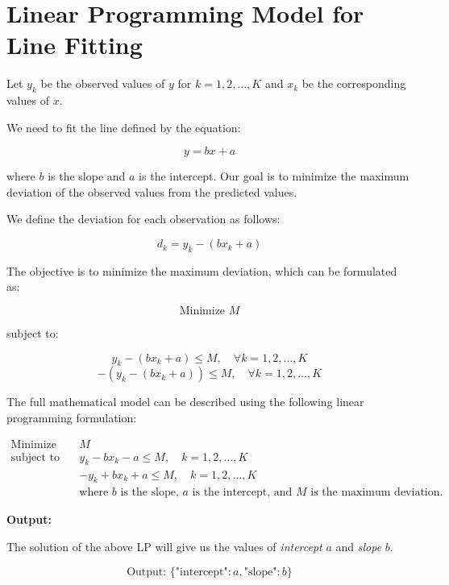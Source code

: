 \documentclass{article}
\begin{document}
\section*{Linear Programming Model for Line Fitting}

Let \( y_k \) be the observed values of \( y \) for \( k = 1, 2, \ldots, K \) and \( x_k \) be the corresponding values of \( x \).

We need to fit the line defined by the equation:

\[
y = bx + a
\]

where \( b \) is the slope and \( a \) is the intercept. Our goal is to minimize the maximum deviation of the observed values from the predicted values.

We define the deviation for each observation as follows:

\[
d_k = y_k - (bx_k + a)
\]

The objective is to minimize the maximum deviation, which can be formulated as:

\[
\text{Minimize } M
\]

subject to:

\[
y_k - (bx_k + a) \leq M, \quad \forall k = 1, 2, \ldots, K
\]
\[
-(y_k - (bx_k + a)) \leq M, \quad \forall k = 1, 2, \ldots, K
\]

The full mathematical model can be described using the following linear programming formulation:

\begin{align*}
\text{Minimize} \quad & M \\
\text{subject to} \quad & y_k - bx_k - a \leq M, \quad k = 1, 2, \ldots, K \\
& -y_k + bx_k + a \leq M, \quad k = 1, 2, \ldots, K \\
& \text{where } b \text{ is the slope, } a \text{ is the intercept, and } M \text{ is the maximum deviation.}
\end{align*}

\textbf{Output:}

The solution of the above LP will give us the values of \textit{intercept} \( a \) and \textit{slope} \( b \).

\[
\text{Output: } \{ \text{"intercept"}: a, \text{"slope"}: b \}
\]
\end{document}
